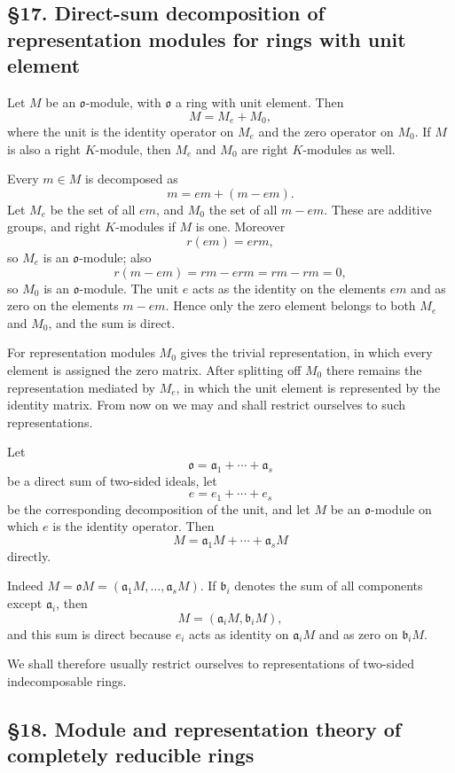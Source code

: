 \documentclass[11pt]{article}
\begin{document}
\subsection{§17. Direct-sum decomposition of representation modules for
rings with unit
element}\label{direct-sum-decomposition-of-representation-modules-for-rings-with-unit-element}

Let \(M\) be an \(\mathfrak{o}\)-module, with \(\mathfrak{o}\) a ring
with unit element. Then \[
  M=M_e+M_0,
\] where the unit is the identity operator on \(M_e\) and the zero
operator on \(M_0\). If \(M\) is also a right \(K\)-module, then \(M_e\)
and \(M_0\) are right \(K\)-modules as well.

Every \(m\in M\) is decomposed as \[
  m=em+(m-em).
\] Let \(M_e\) be the set of all \(em\), and \(M_0\) the set of all
\(m-em\). These are additive groups, and right \(K\)-modules if \(M\) is
one. Moreover \[
  r(em)=er m,
\] so \(M_e\) is an \(\mathfrak{o}\)-module; also \[
  r(m-em)=rm-erm=rm-rm=0,
\] so \(M_0\) is an \(\mathfrak{o}\)-module. The unit \(e\) acts as the
identity on the elements \(em\) and as zero on the elements \(m-em\).
Hence only the zero element belongs to both \(M_e\) and \(M_0\), and the
sum is direct.

For representation modules \(M_0\) gives the trivial representation, in
which every element is assigned the zero matrix. After splitting off
\(M_0\) there remains the representation mediated by \(M_e\), in which
the unit element is represented by the identity matrix. From now on we
may and shall restrict ourselves to such representations.

Let \[
  \mathfrak{o}=\mathfrak a_1+\cdots+\mathfrak a_s
\] be a direct sum of two-sided ideals, let \[
  e=e_1+\cdots+e_s
\] be the corresponding decomposition of the unit, and let \(M\) be an
\(\mathfrak{o}\)-module on which \(e\) is the identity operator. Then \[
  M=\mathfrak a_1M+\cdots+\mathfrak a_sM
\] directly.

Indeed \(M=\mathfrak{o}M=(\mathfrak a_1M,\ldots,\mathfrak a_sM)\). If
\(\mathfrak b_i\) denotes the sum of all components except
\(\mathfrak a_i\), then \[
  M=(\mathfrak a_iM,\mathfrak b_iM),
\] and this sum is direct because \(e_i\) acts as identity on
\(\mathfrak a_iM\) and as zero on \(\mathfrak b_iM\).

We shall therefore usually restrict ourselves to representations of
two-sided indecomposable rings.

\subsection{§18. Module and representation theory of completely
reducible
rings}\label{module-and-representation-theory-of-completely-reducible-rings}
\end{document}
